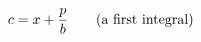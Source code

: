 \documentclass[preview]{standalone}
\begin{document}
\begin{align*}
\special{dvisvgm:raw <g id='unique000'>}c = x + \frac{p}{b}\qquad\text{(a first integral)}\special{dvisvgm:raw </g>}
\end{align*}
\end{document}
